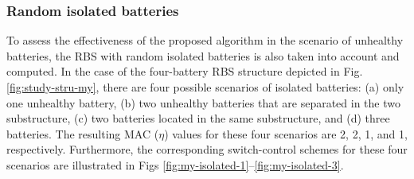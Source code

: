 \documentclass{article}
\begin{document}
\subsubsection{Random isolated batteries}

To assess the effectiveness of the proposed algorithm in the scenario of unhealthy batteries, the RBS with random isolated batteries is also taken into account and computed. 
In the case of the four-battery RBS structure depicted in Fig. \ref{fig:study-stru-my}, there are four possible scenarios of isolated batteries: (a) only one unhealthy battery, (b) two unhealthy batteries that are separated in the two substructure, (c) two batteries located in the same substructure, and (d) three batteries. 
The resulting MAC ($\eta$) values for these four scenarios are 2, 2, 1, and 1, respectively.
Furthermore, the corresponding switch-control schemes for these four scenarios are illustrated in Figs \ref{fig:my-isolated-1}--\ref{fig:my-isolated-3}.
\end{document}

